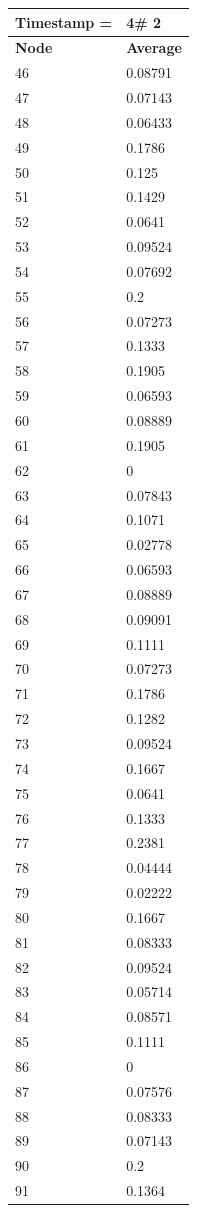 \begin{tabular}{|l||l|}
\hline
\textbf{Timestamp =} & \textbf{4}\# 2\\\hline
	\textbf{Node} & \textbf{Average} \\ \hline
\hline
	46 & 0.08791 \\ \hline
	47 & 0.07143 \\ \hline
	48 & 0.06433 \\ \hline
	49 & 0.1786 \\ \hline
	50 & 0.125 \\ \hline
	51 & 0.1429 \\ \hline
	52 & 0.0641 \\ \hline
	53 & 0.09524 \\ \hline
	54 & 0.07692 \\ \hline
	55 & 0.2 \\ \hline
	56 & 0.07273 \\ \hline
	57 & 0.1333 \\ \hline
	58 & 0.1905 \\ \hline
	59 & 0.06593 \\ \hline
	60 & 0.08889 \\ \hline
	61 & 0.1905 \\ \hline
	62 & 0 \\ \hline
	63 & 0.07843 \\ \hline
	64 & 0.1071 \\ \hline
	65 & 0.02778 \\ \hline
	66 & 0.06593 \\ \hline
	67 & 0.08889 \\ \hline
	68 & 0.09091 \\ \hline
	69 & 0.1111 \\ \hline
	70 & 0.07273 \\ \hline
	71 & 0.1786 \\ \hline
	72 & 0.1282 \\ \hline
	73 & 0.09524 \\ \hline
	74 & 0.1667 \\ \hline
	75 & 0.0641 \\ \hline
	76 & 0.1333 \\ \hline
	77 & 0.2381 \\ \hline
	78 & 0.04444 \\ \hline
	79 & 0.02222 \\ \hline
	80 & 0.1667 \\ \hline
	81 & 0.08333 \\ \hline
	82 & 0.09524 \\ \hline
	83 & 0.05714 \\ \hline
	84 & 0.08571 \\ \hline
	85 & 0.1111 \\ \hline
	86 & 0 \\ \hline
	87 & 0.07576 \\ \hline
	88 & 0.08333 \\ \hline
	89 & 0.07143 \\ \hline
	90 & 0.2 \\ \hline
	91 & 0.1364 \\ \hline
\end{tabular}
